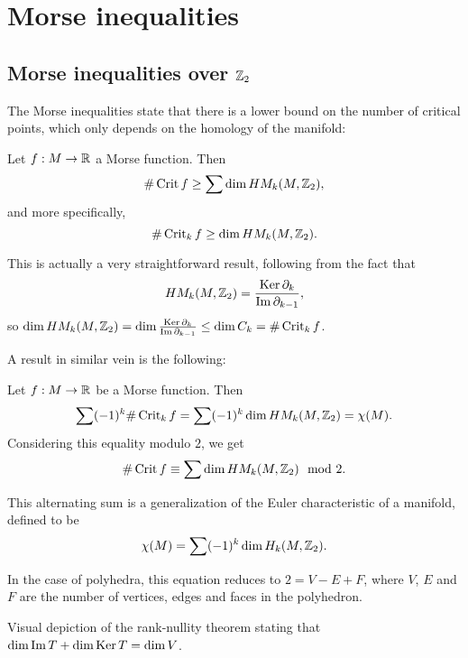 \section{Morse inequalities}
\subsection{Morse inequalities over $\Z_2$}

The Morse inequalities state that there is a lower bound on the number of critical points, which only depends on the homology of the manifold:
\begin{theorem}
    Let $f: M \to  \R$ a Morse function. Then
    \[
        \# \Crit f \ge \sum \dim \HMf[k]{M, \Z_2}
    ,\]
    and more specifically,
    \[
        \# \Crit_k f \ge \dim \HMf[k]{M, \Z_2}
    .\]
\end{theorem}
\begin{myproof}
    This is actually a very straightforward result, following from the fact that \[
    \HMf[k]{M, \Z_2} = \frac{\Ker \partial_k}{\Im \partial_{k-1}},
    \] so $\dim \HMf[k]{M, \Z_2} = \dim \frac{\Ker \partial_k}{\Im \partial_{k-1}} \le  \dim C_k = \# \Crit_k f$.
\end{myproof}

A result in similar vein is the following:
\begin{theorem}
    Let $f: M \to  \R$ be a Morse function. Then
    \[
        \sum (-1)^{k} \# \Crit_k f = \sum (-1)^{k} \dim \HMf[k]{M, \Z_2}  = \chi(M)
    .\]
    Considering this equality modulo $2$, we get
    \[
        \# \Crit f  \equiv \sum \dim \HMf[k]{M, \Z_2} \mod 2
    .\]
\end{theorem}
\begin{remark}
    This alternating sum is a generalization of the Euler characteristic of a manifold, defined to be
    \[
    \chi(M) = \sum (-1)^{k} \dim H_k(M, \Z_2)
    .\]

    In the case of polyhedra, this equation reduces to $2 = V - E + F$, where $V$, $E$ and  $F$ are the number of vertices, edges and faces in the polyhedron.
\end{remark}
\begin{marginfigure}
    \centering
    \caption{Visual depiction of the rank-nullity theorem stating that $\dim \Im T + \dim \Ker T = \dim V$.}
    \label{fig:linear-map-rank-nullity-theorem}
\end{marginfigure}


